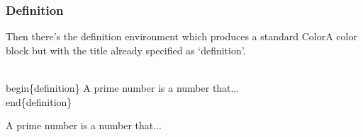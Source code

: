 \label{definition}
\begin{frame}\frametitle{Definition}
  Then there’s the definition environment which produces a standard ColorA color block but with the title already specified as ‘definition’.
  \begin{semiverbatim}
    \\begin\{definition\}\newline
    A prime number is a number that...\newline
    \\end\{definition\}
  \end{semiverbatim}
  \begin{definition}
    A prime number is a number that...
  \end{definition}
\end{frame} 